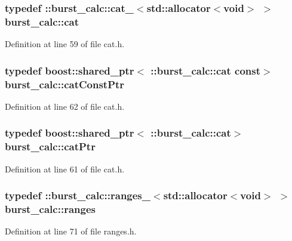 \subsubsection[{cat}]{\setlength{\rightskip}{0pt plus 5cm}typedef \-::{\bf burst\-\_\-calc\-::cat\-\_\-}$<$std\-::allocator$<$void$>$ $>$ {\bf burst\-\_\-calc\-::cat}}\label{namespaceburst__calc_ae6cf4d8bd77971b94c41b061c5e7a0ca}


\-Definition at line 59 of file cat.\-h.

\subsubsection[{cat\-Const\-Ptr}]{\setlength{\rightskip}{0pt plus 5cm}typedef boost\-::shared\-\_\-ptr$<$ \-::{\bf burst\-\_\-calc\-::cat} const$>$ {\bf burst\-\_\-calc\-::cat\-Const\-Ptr}}\label{namespaceburst__calc_a33fa36961285e49f5482de736df62e80}


\-Definition at line 62 of file cat.\-h.

\subsubsection[{cat\-Ptr}]{\setlength{\rightskip}{0pt plus 5cm}typedef boost\-::shared\-\_\-ptr$<$ \-::{\bf burst\-\_\-calc\-::cat}$>$ {\bf burst\-\_\-calc\-::cat\-Ptr}}\label{namespaceburst__calc_a4dad909e8b4b9648ed5de283adf0bc06}


\-Definition at line 61 of file cat.\-h.

\subsubsection[{ranges}]{\setlength{\rightskip}{0pt plus 5cm}typedef \-::{\bf burst\-\_\-calc\-::ranges\-\_\-}$<$std\-::allocator$<$void$>$ $>$ {\bf burst\-\_\-calc\-::ranges}}\label{namespaceburst__calc_a2f503aeee9e4cbd419c095b161d5c4ea}


\-Definition at line 71 of file ranges.\-h.

